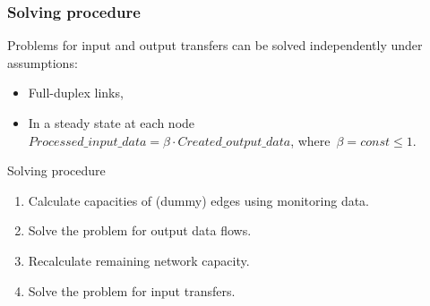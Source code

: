 \documentclass{beamer}
\begin{document}
\begin{frame}\frametitle{Solving procedure}
\begin{block}{}
Problems for input and output transfers can be solved independently under assumptions: 
\begin{itemize}
\item Full-duplex links,
\item In a steady state at each node $Processed\_input\_data= \beta \cdot Created\_output\_data$, where~$\beta = const\leq 1$.
\end{itemize}
\end{block} 

\begin{block}{Solving procedure}
\begin{enumerate}
\item Calculate capacities of (dummy) edges using monitoring data.
\item Solve the problem for output data flows.
\item Recalculate remaining network capacity.
\item Solve the problem for input transfers.
\end{enumerate}
\end{block}    
\end{frame}
\end{document}
